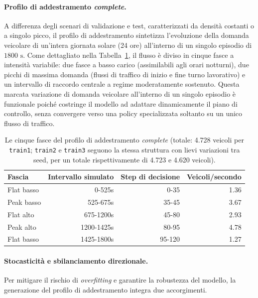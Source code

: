 \paragraph{Profilo di addestramento \emph{complete}.}
A differenza degli scenari di validazione e test, caratterizzati da densità costanti o a singolo picco,
il profilo di addestramento sintetizza l'evoluzione della domanda veicolare di un'intera giornata solare (24 ore) all'interno di un singolo episodio di $1800 \text{ s}$.
Come dettagliato nella Tabella~\ref{tab:workday}, il flusso è diviso in cinque fasce a intensità variabile:
due fasce a basso carico (assimilabili agli orari notturni),
due picchi di massima domanda (flussi di traffico di inizio e fine turno lavorativo) e
un intervallo di raccordo centrale a regime moderatamente sostenuto.
Questa marcata variazione di domanda veicolare all'interno di un singolo episodio è funzionale poiché costringe il modello ad adattare dinamicamente il piano di controllo,
senza convergere verso una policy specializzata soltanto su un unico flusso di traffico.

\begin{table}[htbp]
  \centering
  \small
  \begin{tabular}{@{}p{4.3cm}rrr@{}}
    \toprule
    Fascia     & Intervallo simulato & Step di decisione & Veicoli/secondo \\
    \midrule
    Flat basso & 0-525s              & 0-35              & 1.36            \\
    Peak basso & 525-675s            & 35-45             & 3.67            \\
    Flat alto  & 675-1200s           & 45-80             & 2.93            \\
    Peak alto  & 1200-1425s          & 80-95             & 4.78            \\
    Flat basso & 1425-1800s          & 95-120            & 1.27            \\
    \bottomrule
  \end{tabular}
  \caption{Le cinque fasce del profilo di addestramento \emph{complete}
    (totale: 4.728 veicoli per \texttt{train1}; \texttt{train2} e
    \texttt{train3} seguono la stessa struttura con lievi variazioni tra
    seed, per un totale rispettivamente di 4.723 e 4.620 veicoli).}
  \label{tab:workday}
\end{table}

\paragraph{Stocasticità e sbilanciamento direzionale.}
Per mitigare il rischio di \emph{overfitting} e garantire la robustezza del modello,
la generazione del profilo di addestramento integra due accorgimenti.

